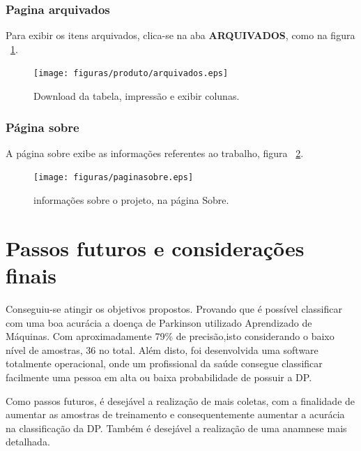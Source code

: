 \subsubsection{Pagina arquivados}
Para exibir os itens arquivados, clica-se na aba \textbf{ARQUIVADOS}, como na figura ~\ref{farquivados}.
\begin{figure}[!htb]
    \centering
    \texttt{[image: figuras/produto/arquivados.eps]}
    \caption{Download da tabela, impressão e exibir colunas.}
    \label{farquivados}
\end{figure}

\subsubsection{Página sobre}
A página sobre exibe as informações referentes ao trabalho, figura ~\ref{fsobre}.
\begin{figure}[!htb]
    \centering
    \texttt{[image: figuras/paginasobre.eps]}
    \caption{informações sobre o projeto, na página Sobre.}
    \label{fsobre}
\end{figure}

\section{Passos futuros e considerações finais}
   Conseguiu-se atingir os objetivos propostos. Provando que é possível classificar com uma boa acurácia a doença de Parkinson utilizado Aprendizado de Máquinas. Com aproximadamente 79\% de precisão,isto considerando o baixo nível de amostras, 36 no total. Além disto, foi desenvolvida uma software totalmente operacional, onde um profissional da saúde consegue classificar facilmente uma pessoa em alta ou baixa probabilidade de possuir a DP.

   Como passos futuros, é desejável a realização de mais coletas, com a finalidade de aumentar as amostras de treinamento e consequentemente aumentar a acurácia na classificação da DP. Também é desejável a realização de uma anamnese mais detalhada.
